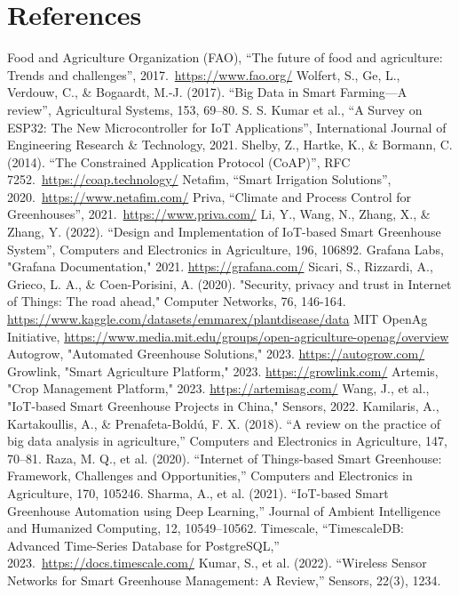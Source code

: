 \documentclass[12pt,a4paper]{article}
\begin{document}
\section{References}
\begin{thebibliography}{99}
 Food and Agriculture Organization (FAO), ``The future of food and agriculture: Trends and challenges'', 2017.\ \url{https://www.fao.org/}
 Wolfert, S., Ge, L., Verdouw, C., \& Bogaardt, M.-J. (2017). ``Big Data in Smart Farming---A review'', Agricultural Systems, 153, 69--80.
 S. S. Kumar et al., ``A Survey on ESP32: The New Microcontroller for IoT Applications'', International Journal of Engineering Research \& Technology, 2021.
 Shelby, Z., Hartke, K., \& Bormann, C. (2014). ``The Constrained Application Protocol (CoAP)'', RFC 7252.\ \url{https://coap.technology/}
 Netafim, ``Smart Irrigation Solutions'', 2020.\ \url{https://www.netafim.com/}
 Priva, ``Climate and Process Control for Greenhouses'', 2021.\ \url{https://www.priva.com/}
 Li, Y., Wang, N., Zhang, X., \& Zhang, Y. (2022). ``Design and Implementation of IoT-based Smart Greenhouse System'', Computers and Electronics in Agriculture, 196, 106892.
 Grafana Labs, "Grafana Documentation," 2021. \url{https://grafana.com/}
 Sicari, S., Rizzardi, A., Grieco, L. A., \& Coen-Porisini, A. (2020). "Security, privacy and trust in Internet of Things: The road ahead," Computer Networks, 76, 146-164.
 \url{https://www.kaggle.com/datasets/emmarex/plantdisease/data}
 MIT OpenAg Initiative, \url{https://www.media.mit.edu/groups/open-agriculture-openag/overview}
 Autogrow, "Automated Greenhouse Solutions," 2023. \url{https://autogrow.com/}
 Growlink, "Smart Agriculture Platform," 2023. \url{https://growlink.com/}
 Artemis, "Crop Management Platform," 2023. \url{https://artemisag.com/}
 Wang, J., et al., "IoT-based Smart Greenhouse Projects in China," Sensors, 2022.
 Kamilaris, A., Kartakoullis, A., \& Prenafeta-Boldú, F. X. (2018). ``A review on the practice of big data analysis in agriculture,'' Computers and Electronics in Agriculture, 147, 70--81.
 Raza, M. Q., et al. (2020). ``Internet of Things-based Smart Greenhouse: Framework, Challenges and Opportunities,'' Computers and Electronics in Agriculture, 170, 105246.
 Sharma, A., et al. (2021). ``IoT-based Smart Greenhouse Automation using Deep Learning,'' Journal of Ambient Intelligence and Humanized Computing, 12, 10549--10562.
 Timescale, ``TimescaleDB: Advanced Time-Series Database for PostgreSQL,'' 2023.\ \url{https://docs.timescale.com/}
 Kumar, S., et al. (2022). ``Wireless Sensor Networks for Smart Greenhouse Management: A Review,'' Sensors, 22(3), 1234.
\end{thebibliography}
\end{document}
